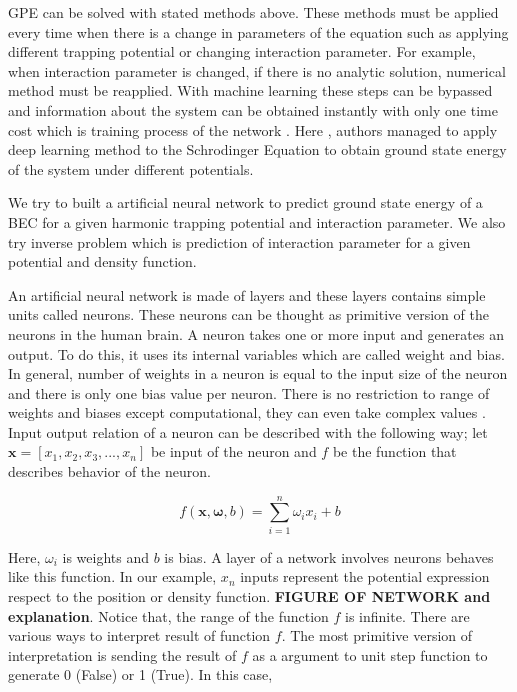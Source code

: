 \documentclass[a4paper,times,12pt]{article}
\begin{document}
GPE can be solved with stated methods above. These methods must be applied every time when there is a change in parameters of the equation such as applying different trapping potential or changing interaction parameter. For example, when interaction parameter is changed, if there is no analytic solution, numerical method must be reapplied. With machine learning these steps can be bypassed and information about the system can be obtained instantly with only one time cost which is training process of the network \cite{mills2017deep}. Here \cite{mills2017deep}, authors managed to apply deep learning method to the Schrodinger Equation to obtain ground state energy of the system under different potentials. 

We try to built a artificial neural network to predict ground state energy of a BEC for a given harmonic trapping potential and interaction parameter. We also try inverse problem which is prediction of interaction parameter for a given potential and density function. 

An artificial neural network is made of layers and these layers contains simple units called neurons. These neurons can be thought as primitive version of the neurons in the human brain. A neuron takes one or more input and generates an output. To do this, it uses its internal variables which are called weight and bias. In general, number of weights in a neuron is equal to the input size of the neuron and there is only one bias value per neuron. There is no restriction to range of weights and biases except computational, they can even take complex values \cite{zimmermann2011comparison}. Input output relation of a neuron can be described with the following way; let $\boldsymbol{x} = [x_1, x_2, x_3, ..., x_n]$ be input of the neuron and $f$ be the function that describes behavior of the neuron. 

\begin{equation}
\label{eq:NU_neuron}
f(\boldsymbol{x}, \boldsymbol{\omega}, b) = \sum\limits_{i = 1}^n \omega_i x_i + b
\end{equation}

Here, $\omega_i$ is weights and $b$ is bias. A layer of a network involves neurons behaves like this function. In our example, $x_n$ inputs represent the potential expression respect to the position or density function. \textbf{FIGURE OF NETWORK and explanation}. Notice that, the range of the function $f$ is infinite. There are various ways to interpret result of function $f$. The most primitive version of interpretation is sending the result of $f$ as a argument to unit step function to generate 0 (False) or 1 (True). In this case, 
\end{document}
